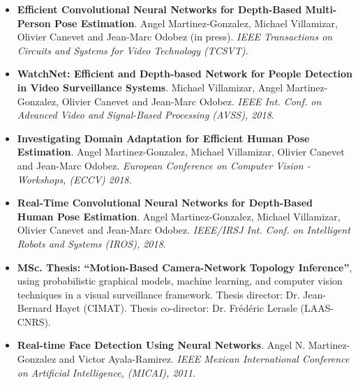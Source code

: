 \documentclass[10 pt]{article}
\begin{document}
\begin{itemize}[noitemsep]

\item \textbf{Efficient Convolutional Neural Networks for Depth-Based Multi-Person Pose Estimation}. 
Angel Martinez-Gonzalez, Michael Villamizar, Olivier Canevet and Jean-Marc Odobez (in press).
\textit{IEEE Transactions on Circuits and Systems for Video Technology (TCSVT)}.
\vspace{.05cm}
%

\item \textbf{WatchNet: Efficient and Depth-based Network for People Detection in Video Surveillance Systems}.
Michael Villamizar, Angel Martinez-Gonzalez, Olivier Canevet and Jean-Marc Odobez.
\textit{IEEE Int. Conf. on Advanced Video and Signal-Based Processing (AVSS), 2018}.
\vspace{.05cm}
%

\item  \textbf{Investigating Domain Adaptation for Efficient Human Pose Estimation}.
Angel Martinez-Gonzalez, Michael Villamizar, Olivier Canevet and Jean-Marc Odobez.
\textit{European Conference on Computer Vision - Workshops, (ECCV) 2018}.
\vspace{.05cm}

\item \textbf{Real-Time Convolutional Neural Networks for Depth-Based Human Pose Estimation}.
Angel Martinez-Gonzalez, Michael Villamizar, Olivier Canevet and Jean-Marc Odobez.
\textit{IEEE/IRSJ Int. Conf. on Intelligent Robots and Systems (IROS), 2018}.
\vspace{.05cm}

\item \textbf{MSc. Thesis: “Motion-Based Camera-Network Topology Inference”}, using probabilistic graphical models, machine learning, and computer 
vision techniques in a visual surveillance framework. Thesis director: Dr. Jean-Bernard Hayet (CIMAT). 
Thesis co-director: Dr. Frédéric Lerasle (LAAS-CNRS).
\vspace{.05cm}
%

\item \textbf{Real-time Face Detection Using Neural Networks}. 
Angel N. Martinez-Gonzalez and Victor Ayala-Ramirez. 
\textit{IEEE Mexican International Conference on Artificial Intelligence, (MICAI), 2011.}
\vspace{.05cm}

\end{itemize}
%
%
\end{document}
